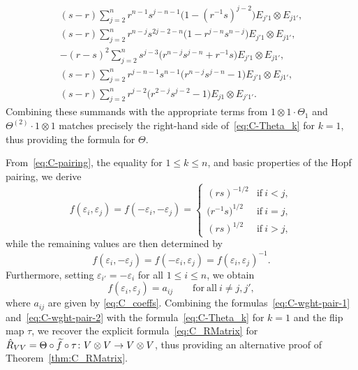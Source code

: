 \documentclass[pdftex]{sigma}
\numberwithin{equation}{section}
\begin{document}
\begin{gather*}
 (s - r)\sum_{j = 2}^{n}r^{n - 1}s^{j - n - 1}\bigl(1 - (r^{-1}s)^{j - 2}\bigr)E_{j'1} \otimes E_{j1'},
\\
 (s - r)\sum_{j = 2}^{n}r^{n - j}s^{2j - 2 - n}\bigl(1 - r^{j - n}s^{n- j}\bigr)E_{j'1} \otimes E_{j1'},
\\
 -(r - s)^{2}\sum_{j =2}^{n}s^{j - 3}\bigl(r^{n - j}s^{j - n} + r^{-1}s\bigr)E_{j'1} \otimes E_{j1'},
\\
 (s - r)\sum_{j = 2}^{n}r^{j - n - 1}s^{n - 1}\bigl(r^{n - j}s^{j - n} - 1\bigr)E_{j'1} \otimes E_{j1'},
\\
 (s - r)\sum_{j = 2}^{n}r^{j - 2}\bigl(r^{2 - j}s^{j - 2} - 1\bigr)E_{j1} \otimes E_{j'1'}.
\end{gather*}
Combining these summands with the appropriate terms from $1 \otimes 1 \cdot \Theta_{1}$ and $\Theta^{(2)}\cdot 1 \otimes 1$ matches precisely the right-hand side of~\eqref{eq:C-Theta_k} for $k=1$, thus providing the formula for $\Theta$.

From~\eqref{eq:C-pairing}, the equality   for $1\leq k\leq n$, and basic properties of the Hopf pairing, we derive
\begin{equation}\label{eq:C-wght-pair-1}
 f(\varepsilon_{i},\varepsilon_{j}) = f(-\varepsilon_{i},-\varepsilon_{j}) =
 \begin{cases}
 (rs)^{-1/2} & \text{if} \ i < j, \\
 \bigl(r^{-1}s\bigr)^{1/2} & \text{if}\ i = j, \\
 (rs)^{1/2} & \text{if}\ i > j,
 \end{cases}
\end{equation}
while the remaining values are then determined by
\begin{equation}\label{eq:C-wght-pair-2}
 f(\varepsilon_{i},-\varepsilon_{j}) = f(-\varepsilon_{i},\varepsilon_{j}) = f(\varepsilon_{i},\varepsilon_{j})^{-1}.
\end{equation}
Furthermore, setting $\varepsilon_{i'} = -\varepsilon_{i}$ for all $1 \le i \le n$, we obtain
\begin{equation}\label{eq:f_aij_CD}
 f(\varepsilon_{i},\varepsilon_{j}) = a_{ij} \qquad \mathrm{for\ all} \ i \neq j,j',
\end{equation}
where $a_{ij}$ are given by \eqref{eq:C_coeffs}. Combining the formulas~\eqref{eq:C-wght-pair-1} and~\eqref{eq:C-wght-pair-2} with the formula~\eqref{eq:C-Theta_k} for $k=1$ and the flip map $\tau$, we recover the explicit formula~\eqref{eq:C_RMatrix} for $\smash{\hat{R}_{VV}=\Theta \circ \widetilde{f}} \circ \tau\colon V \otimes V \to V \otimes V$, thus providing an alternative proof of Theorem~\ref{thm:C_RMatrix}.
\end{document}
